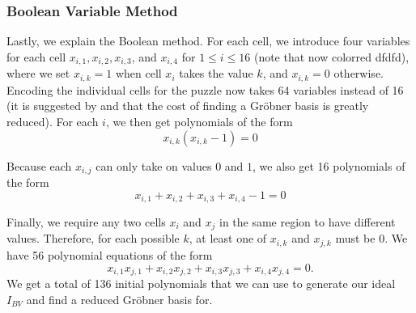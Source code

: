 \documentclass[../main.tex]{subfiles}
\begin{document}
            \subsubsection{Boolean Variable Method}

            Lastly, we explain the Boolean method. For each cell, we introduce four variables for each cell $x_{i,1}, x_{i,2}, x_{i,3}$, and $x_{i,4}$ for $1\leq i\leq 16$ (note that now {color{red} dfdfd}), where we set $x_{i,k}=1$ when cell $x_i$ takes the value $k$, and $x_{i,k}=0$ otherwise. Encoding the individual cells for the puzzle now takes 64 variables instead of 16 (it is suggested by \citet{bernasconi1997computing} and \citet{sato2008computation} that the cost of finding a Gr\"obner basis is greatly reduced). For each $i$, we then get polynomials of the form
            \begin{equation} \label{eq:bool}
                x_{i,k}(x_{i,k}-1)=0
            \end{equation}

            Because each $x_{i,j}$ can only take on values $0$ and $1$, we also get 16 polynomials of the form
            \begin{equation} \label{eq:bool sum}
                x_{i,1}+x_{i,2}+x_{i,3}+x_{i,4}-1=0
            \end{equation}

            Finally, we require any two cells $x_i$ and $x_j$ in the same region to have different values. Therefore, for each possible $k$, at least one of $x_{i,k}$ and $x_{j,k}$ must be 0. We have 56 polynomial equations of the form
            \begin{equation} \label{eq:bool prod}
                x_{i,1}x_{j,1} + x_{i,2}x_{j,2} + x_{i,3}x_{j,3} + x_{i,4}x_{j,4} = 0.
            \end{equation}
            We get a total of 136 initial polynomials that we can use to generate our ideal $I_{BV}$ and find a reduced Gr\"obner basis for.
\end{document}
